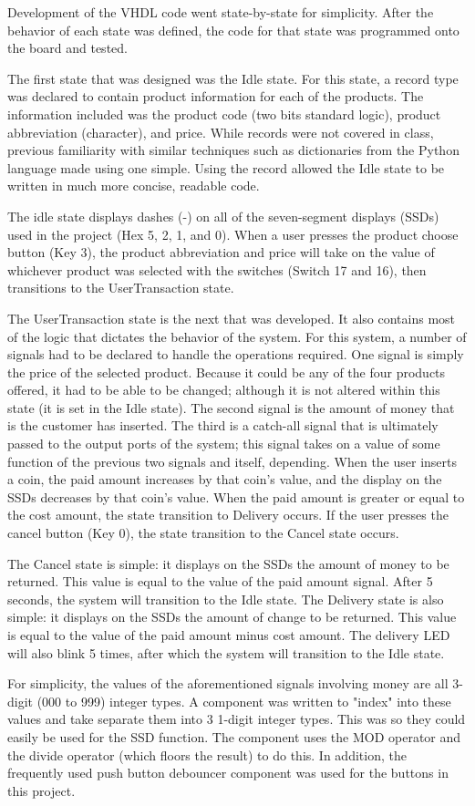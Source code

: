 \documentclass[12pt]{article}
\begin{document}
Development of the VHDL code went state-by-state for simplicity.  After the behavior of each state was defined, the code for that state was programmed onto the board and tested.\par
The first state that was designed was the Idle state.  For this state, a record type was declared to contain product information for each of the products.  The information included was the product code (two bits standard logic), product abbreviation (character), and price.  While records were not covered in class, previous familiarity with similar techniques such as dictionaries from the Python language made using one simple.  Using the record allowed the Idle state to be written in much more concise, readable code.\par
The idle state displays dashes (-) on all of the seven-segment displays (SSDs) used in the project (Hex 5, 2, 1, and 0).  When a user presses the product choose button (Key 3), the product abbreviation and price will take on the value of whichever product was selected with the switches (Switch 17 and 16), then transitions to the UserTransaction state.\par
The UserTransaction state is the next that was developed.  It also contains most of the logic that dictates the behavior of the system.  For this system, a number of signals had to be declared to handle the operations required.  One signal is simply the price of the selected product.  Because it could be any of the four products offered, it had to be able to be changed; although it is not altered within this state (it is set in the Idle state).  The second signal is the amount of money that is the customer has inserted.  The third is a catch-all signal that is ultimately passed to the output ports of the system; this signal takes on a value of some function of the previous two signals and itself, depending.  When the user inserts a coin, the paid amount increases by that coin's value, and the display on the SSDs decreases by that coin's value.  When the paid amount is greater or equal to the cost amount, the state transition to Delivery occurs.  If the user presses the cancel button (Key 0), the state transition to the Cancel state occurs.\par
The Cancel state is simple: it displays on the SSDs the amount of money to be returned.  This value is equal to the value of the paid amount signal.  After 5 seconds, the system will transition to the Idle state.  The Delivery state is also simple: it displays on the SSDs the amount of change to be returned.  This value is equal to the value of the paid amount minus cost amount.  The delivery LED will also blink 5 times, after which the system will transition to the Idle state.\par
For simplicity, the values of the aforementioned signals involving money are all 3-digit (000 to 999) integer types.  A component was written to "index" into these values and take separate them into 3 1-digit integer types.  This was so they could easily be used for the SSD function.  The component uses the MOD operator and the divide operator (which floors the result) to do this.  In addition, the frequently used push button debouncer component was used for the buttons in this project.
\end{document}
